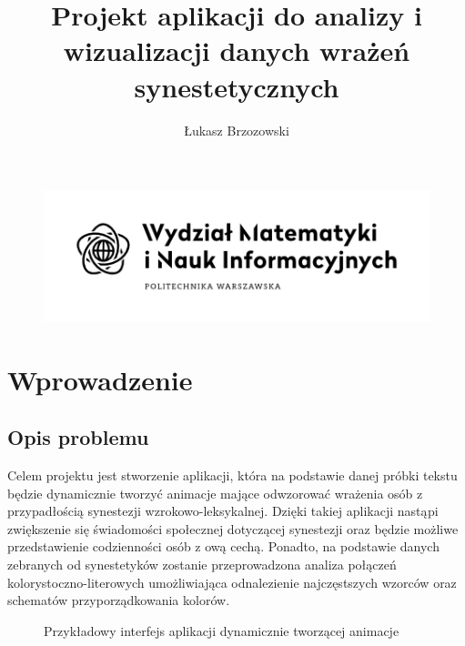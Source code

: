 \documentclass[12pt]{article}
\begin{document}
\title{Projekt aplikacji do analizy i wizualizacji danych wrażeń synestetycznych}
\author{Łukasz Brzozowski}
\maketitle
\begin{figure}[ht!]
	\centering
	\includegraphics[width=\textwidth]{MiNI.png}
\end{figure}
\pagebreak
\tableofcontents
\pagebreak
\section{Wprowadzenie}
\subsection{Opis problemu}
	Celem projektu jest stworzenie aplikacji, która na podstawie danej próbki tekstu będzie dynamicznie tworzyć animacje mające odwzorować wrażenia osób z przypadłością synestezji wzrokowo-leksykalnej. Dzięki takiej aplikacji nastąpi zwiększenie się świadomości społecznej dotyczącej synestezji oraz będzie możliwe przedstawienie codzienności osób z ową cechą. Ponadto, na podstawie danych zebranych od synestetyków zostanie przeprowadzona analiza połączeń kolorystoczno-literowych umożliwiająca odnalezienie najczęstszych wzorców oraz schematów przyporządkowania kolorów. 
\begin{figure}[ht!]
	\centering
	\caption{Przykładowy interfejs aplikacji dynamicznie tworzącej animacje}
\end{figure}
\end{document}
